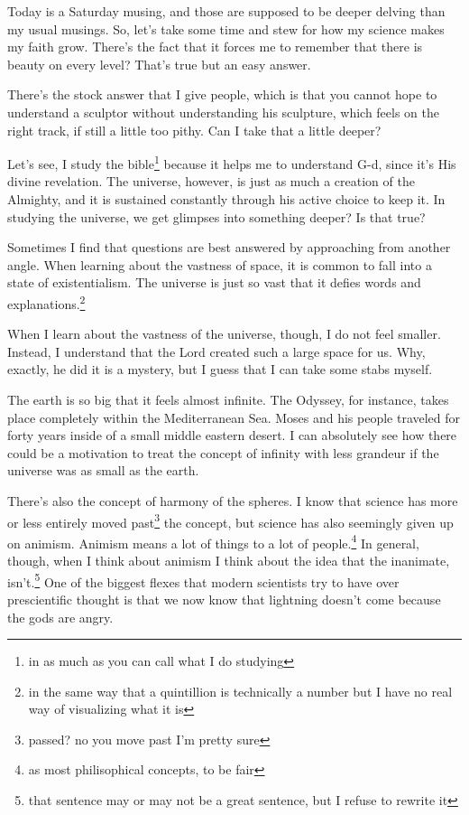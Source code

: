 \documentclass[12pt]{article}[titlepage]
\newcommand{\1}{\={a}}
\newcommand{\2}{\={e}}
\newcommand{\3}{\={\i}}
\newcommand{\4}{\=o}
\newcommand{\5}{\=u}
\newcommand{\6}{\={A}}
\renewcommand{\,}{\textsuperscript{,}}
\begin{document}
Today is a Saturday musing, and those are supposed to be deeper delving than my usual musings.
So, let's take some time and stew for how my science makes my faith grow.
There's the fact that it forces me to remember that there is beauty on every level?
That's true but an easy answer.

There's the stock answer that I give people, which is that you cannot hope to understand a sculptor without understanding his sculpture, which feels on the right track, if still a little too pithy.
Can I take that a little deeper?

Let's see, I study the bible\footnote{in as much as you can call what I do studying} because it helps me to understand G-d, since it's His divine revelation.
The universe, however, is just as much a creation of the Almighty, and it is sustained constantly through his active choice to keep it.
In studying the universe, we get glimpses into something deeper?
Is that true?

Sometimes I find that questions are best answered by approaching from another angle.
When learning about the vastness of space, it is common to fall into a state of existentialism.
The universe is just so vast that it defies words and explanations.\footnote{in the same way that a quintillion is technically a number but I have no real way of visualizing what it is}

When I learn about the vastness of the universe, though, I do not feel smaller.
Instead, I understand that the Lord created such a large space for us.
Why, exactly, he did it is a mystery, but I guess that I can take some stabs myself.

The earth is so big that it feels almost infinite.
The Odyssey, for instance, takes place completely within the Mediterranean Sea.
Moses and his people traveled for forty years inside of a small middle eastern desert.
I can absolutely see how there could be a motivation to treat the concept of infinity with less grandeur if the universe was as small as the earth.

There's also the concept of harmony of the spheres.
I know that science has more or less entirely moved past\footnote{passed? no you move past I'm pretty sure} the concept, but science has also seemingly given up on animism.
Animism means a lot of things to a lot of people.\footnote{as most philisophical concepts, to be fair}
In general, though, when I think about animism I think about the idea that the inanimate, isn't.\footnote{that sentence may or may not be a great sentence, but I refuse to rewrite it}
One of the biggest flexes that modern scientists try to have over prescientific thought is that we now know that lightning doesn't come because the gods are angry.
\end{document}
